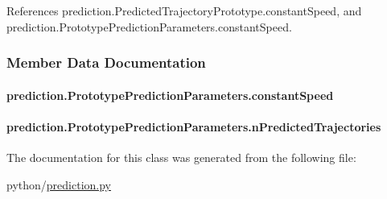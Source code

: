 References prediction.\-Predicted\-Trajectory\-Prototype.\-constant\-Speed, and prediction.\-Prototype\-Prediction\-Parameters.\-constant\-Speed.



\subsubsection{Member Data Documentation}
\hypertarget{classprediction_1_1PrototypePredictionParameters_ab70c4623b54e5948decc19fa10336183}{
\paragraph[{constant\-Speed}]{\setlength{\rightskip}{0pt plus 5cm}prediction.\-Prototype\-Prediction\-Parameters.\-constant\-Speed}}\label{classprediction_1_1PrototypePredictionParameters_ab70c4623b54e5948decc19fa10336183}
\hypertarget{classprediction_1_1PrototypePredictionParameters_ae4b267ae335ef578d64ee0a438ccfd3a}{
\paragraph[{n\-Predicted\-Trajectories}]{\setlength{\rightskip}{0pt plus 5cm}prediction.\-Prototype\-Prediction\-Parameters.\-n\-Predicted\-Trajectories}}\label{classprediction_1_1PrototypePredictionParameters_ae4b267ae335ef578d64ee0a438ccfd3a}


The documentation for this class was generated from the following file\-:\begin{DoxyCompactItemize}
\item 
python/\hyperlink{prediction_8py}{prediction.\-py}\end{DoxyCompactItemize}
